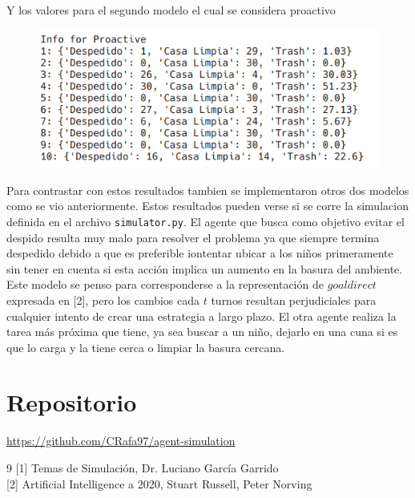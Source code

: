 \documentclass[a4paper,10pt,twocolumn]{article}
\begin{document}
Y los valores para el segundo modelo el cual se considera proactivo

\begin{figure}[h]
	\includegraphics[scale=0.65]{./imgs/proactive}
\end{figure}

Para contrastar con estos resultados tambien se implementaron otros dos modelos como se vio anteriormente. Estos resultados pueden verse si se corre la simulacion definida en el archivo \verb|simulator.py|. El agente que busca como objetivo evitar el despido resulta muy malo para resolver el problema ya que siempre termina despedido debido a que es preferible iontentar ubicar a los ni\~nos primeramente sin tener en cuenta si esta acci\'on implica un aumento en la basura del ambiente. Este modelo se penso para corresponderse a la representaci\'on de $goal direct$ expresada en [2], pero los cambios cada $t$ turnos resultan perjudiciales para cualquier intento de crear una estrategia a largo plazo. El otra agente realiza la tarea m\'as pr\'oxima que tiene, ya sea buscar a un ni\~no, dejarlo en una cuna si es que lo carga y la tiene cerca o limpiar la basura cercana.

\section*{Repositorio}

\url{https://github.com/CRafa97/agent-simulation}

\begin{thebibliography}{9}
	[1] Temas de Simulaci\'on, Dr. Luciano Garc\'ia Garrido\\
	
	[2] Artificial Intelligence a 2020, Stuart Russell, Peter Norving
\end{thebibliography}

\label{end}
\end{document}
